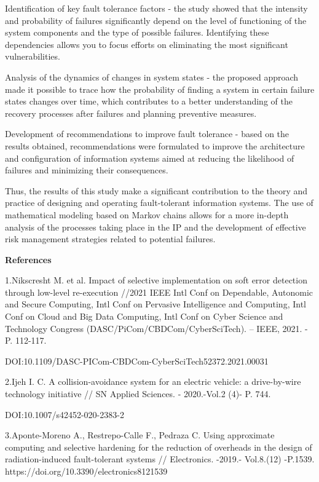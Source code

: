 Identification of key fault tolerance factors - the study showed that
the intensity and probability of failures significantly depend on the
level of functioning of the system components and the type of possible
failures. Identifying these dependencies allows you to focus efforts on
eliminating the most significant vulnerabilities.

Analysis of the dynamics of changes in system states - the proposed
approach made it possible to trace how the probability of finding a
system in certain failure states changes over time, which contributes to
a better understanding of the recovery processes after failures and
planning preventive measures.

Development of recommendations to improve fault tolerance - based on the
results obtained, recommendations were formulated to improve the
architecture and configuration of information systems aimed at reducing
the likelihood of failures and minimizing their consequences.

Thus, the results of this study make a significant contribution to the
theory and practice of designing and operating fault-tolerant
information systems. The use of mathematical modeling based on Markov
chains allows for a more in-depth analysis of the processes taking place
in the IP and the development of effective risk management strategies
related to potential failures.

\textbf{References}

1.Nikscresht M. et al. Impact of selective implementation on soft error
detection through low-level re-execution //2021 IEEE Intl Conf on
Dependable, Autonomic and Secure Computing, Intl Conf on Pervasive
Intelligence and Computing, Intl Conf on Cloud and Big Data Computing,
Intl Conf on Cyber Science and Technology Congress
(DASC/PiCom/CBDCom/CyberSciTech). -- IEEE, 2021. - P. 112-117.

DOI:10.1109/DASC-PICom-CBDCom-CyberSciTech52372.2021.00031

2.Ijeh I. C. A collision-avoidance system for an electric vehicle: a
drive-by-wire technology initiative // SN Applied Sciences. -
2020.-Vol.2 (4)- P. 744.

DOI:10.1007/s42452-020-2383-2

3.Aponte-Moreno A., Restrepo-Calle F., Pedraza C. Using approximate
computing and selective hardening for the reduction of overheads in the
design of radiation-induced fault-tolerant systems // Electronics.
-2019.- Vol.8.(12) -P.1539. https://doi.org/10.3390/electronics8121539

